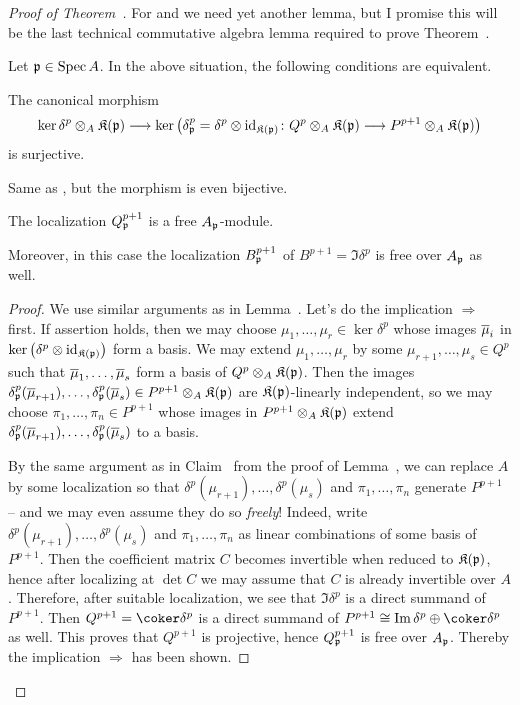 \documentclass[a4paper,parskip=half,numbers=enddot, DIV=12]{scrreprt}
\begin{document}
\begin{proof}[Proof of Theorem~]
	For  and  we need yet another lemma, but I promise this will be the last technical commutative algebra lemma required to prove Theorem~.
	\begin{lem}
		Let $\mathfrak{p}\in \operatorname{Spec} A$. In the above situation, the following conditions are equivalent.
		\begin{alphanumerate}
			\item The canonical morphism
			\begin{align*}
				\ker\delta^p\otimes_A\KK(\pp)\morphism\ker\left(\delta^p_\pp=\delta^p\otimes \id_{\KK(\pp)}\colon Q^p\otimes_A\KK(\pp)\morphism P^{p+1}\otimes_A\KK(\pp)\right)
			\end{align*}
			is surjective.
			\item Same as , but the morphism is even bijective.
			\item The localization $Q^{p+1}_{\mathfrak{p}}$ is a free $A_{\mathfrak{p}}$-module.
		\end{alphanumerate}
		Moreover, in this case the localization $B^{p+1}_{\mathfrak{p}}$ of $B^{p+1}=\Im\delta^p$ is free over $A_{\mathfrak{p}}$ as well.
	\end{lem}
\begin{proof}
	We use similar arguments as in Lemma~. Let's do the implication  $\Rightarrow$  first. If assertion  holds, then we may choose $\mu_1,\ldots,\mu_r\in\ker \delta^p$ whose images $\overline{\mu}_i$ in $\ker\left(\delta^p\otimes\operatorname{id}_{\mathfrak{K}(\mathfrak{p})}\right)$ form a basis. We may extend $\mu_1,\ldots,\mu_r$ by some $\mu_{r+1},\ldots,\mu_s\in Q^p$ such that $\overline{\mu}_1,\ldots,\overline{\mu}_s$ form a basis of $Q^p\otimes_A\mathfrak{K}(\mathfrak{p})$. Then the images $\delta_{\mathfrak{p}}^p(\overline{\mu}_{r+1}),\ldots,\delta_{\mathfrak{p}}^p(\overline{\mu}_s)\in P^{p+1}\otimes_A\mathfrak{K}(\mathfrak{p})$ are $\mathfrak{K}(\mathfrak{p})$-linearly independent, so we may choose $\pi_1,\ldots,\pi_n\in P^{p+1}$ whose images in $P^{p+1}\otimes_A\mathfrak{K}(\mathfrak{p})$ extend $\delta_{\mathfrak{p}}^p(\overline{\mu}_{r+1}),\ldots,\delta_{\mathfrak{p}}^p(\overline{\mu}_s)$ to a basis.
	
	By the same argument as in Claim~ from the proof of Lemma~, we can replace $A$ by some localization so that $\delta^p(\mu_{r+1}),\ldots,\delta^p(\mu_s)$ and $\pi_1,\ldots,\pi_n$ generate $P^{p+1}$ -- and we may even assume they do so \emph{freely}! Indeed, write $\delta^p(\mu_{r+1}),\ldots,\delta^p(\mu_s)$ and $\pi_1,\ldots,\pi_n$ as linear combinations of some basis of $P^{p+1}$. Then the coefficient matrix $C$ becomes invertible when reduced to $\mathfrak{K}(\mathfrak{p})$, hence after localizing at $\det C$ we may assume that $C$ is already invertible over $A$. Therefore, after suitable localization, we see that $\Im\delta^p$ is a direct summand of $P^{p+1}$. Then $Q^{p+1}=\coker\delta^p$ is a direct summand of $P^{p+1}\cong \Im\delta^p\oplus\coker\delta^p$ as well. This proves that $Q^{p+1}$ is projective, hence $Q^{p+1}_{\mathfrak{p}}$ is free over $A_{\mathfrak{p}}$. Thereby the implication  $\Rightarrow$  has been shown.
	

\end{proof}
\end{proof}
\end{document}

